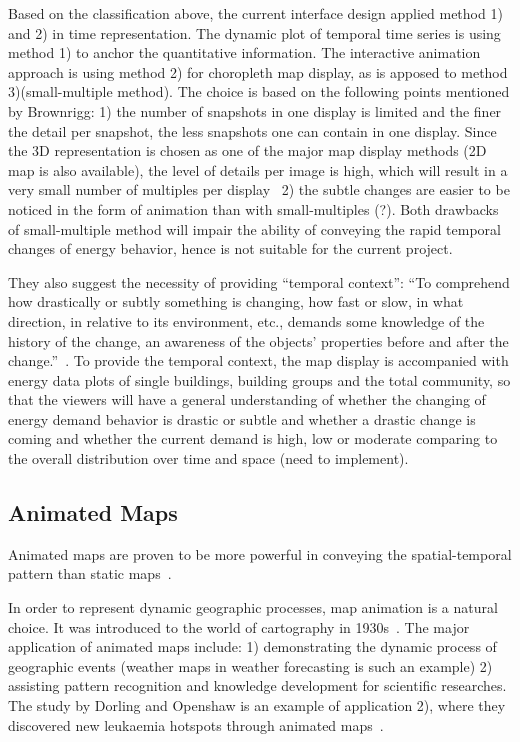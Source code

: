Based on the classification above, the current interface design
applied method 1) and 2) in time representation. The dynamic plot of
temporal time series is using method 1) to anchor the quantitative
information. The interactive animation approach is using method 2) for
choropleth map display, as is apposed to method 3)(small-multiple
method). The choice is based on the following points mentioned by
Brownrigg: 1) the number of snapshots in one display is limited and
the finer the detail per snapshot, the less snapshots one can contain
in one display. Since the 3D representation is chosen as one of the
major map display methods (2D map is also available), the level of
details per image is high, which will result in a very small number of
multiples per display~\cite{Brownrigg2005} 2) the subtle changes are
easier to be noticed in the form of animation than with
small-multiples (?). Both drawbacks of small-multiple method will
impair the ability of conveying the rapid temporal changes of energy
behavior, hence is not suitable for the current project.

They also suggest the necessity of providing ``temporal context'':
``To comprehend how drastically or subtly something is changing, how
fast or slow, in what direction, in relative to its environment, etc.,
demands some knowledge of the history of the change, an awareness of
the objects' properties before and after the
change.''~\cite{Brownrigg2005}. To provide the temporal context, the
map display is accompanied with energy data plots of single buildings,
building groups and the total community, so that the viewers will have
a general understanding of whether the changing of energy demand
behavior is drastic or subtle and whether a drastic change is coming
and whether the current demand is high, low or moderate comparing to
the overall distribution over time and space (need to implement).

\subsection{Animated Maps}\label{anime}
Animated maps are proven to be more powerful in conveying the
spatial-temporal pattern than static maps~\cite{McEachern1998}.

In order to represent dynamic geographic processes, map animation is a
natural choice. It was introduced to the world of cartography in
1930s~\cite{Harrower2008}. The major application of animated maps
include: 1) demonstrating the dynamic process of geographic events
(weather maps in weather forecasting is such an example) 2) assisting
pattern recognition and knowledge development for scientific
researches. The study by Dorling and Openshaw is an example of 
application 2), where they discovered new leukaemia hotspots through
animated maps~\cite{Dorling1992}.

